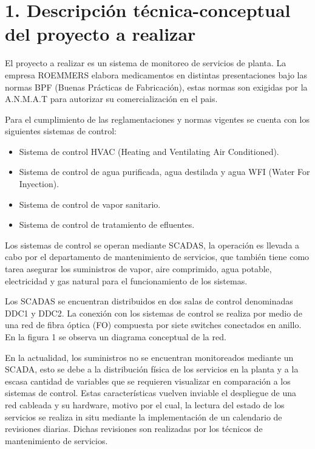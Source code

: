 \documentclass[
11pt, %
]{charter}
\begin{document}
\section{1. Descripción técnica-conceptual del proyecto a realizar}
\label{sec:descripcion}



El proyecto a realizar es un sistema de monitoreo de servicios de planta. La empresa ROEMMERS elabora medicamentos en distintas presentaciones bajo las normas BPF (Buenas Prácticas de Fabricación), estas normas son exigidas por la A.N.M.A.T para autorizar su comercialización en el pais. %

Para el cumplimiento de las reglamentaciones y normas vigentes se cuenta con los siguientes sistemas de control:
\begin{itemize}
	\item Sistema de control HVAC (Heating and Ventilating Air Conditioned).
	\item Sistema de control de agua purificada, agua destilada y agua WFI (Water For Inyection).
	\item Sistema de control de vapor sanitario.
	\item Sistema de control de tratamiento de efluentes.
\end{itemize}

Los sistemas de control se operan mediante SCADAS, la operación es llevada a cabo por el departamento de mantenimiento de servicios, que también tiene como tarea asegurar los suministros de vapor, aire comprimido, agua potable, electricidad y gas natural para el funcionamiento de los sistemas.

Los SCADAS se encuentran distribuidos en dos salas de control denominadas DDC1 y DDC2. La conexión con los sistemas de control se realiza por medio de una red de fibra óptica (FO) compuesta por siete switches conectados en anillo. En la figura 1 se observa un diagrama conceptual de la red. 

En la actualidad, los suministros no se encuentran monitoreados mediante un SCADA, esto se debe a la distribución física de los servicios en la planta y a la escasa cantidad de variables que se requieren visualizar en comparación a los sistemas de control. Estas características vuelven inviable el despliegue de una red cableada y su hardware, motivo por el cual, la lectura del estado de los servicios se realiza in situ mediante la implementación de un calendario de revisiones diarias. Dichas revisiones son realizadas por los técnicos de mantenimiento de servicios.
\end{document}
